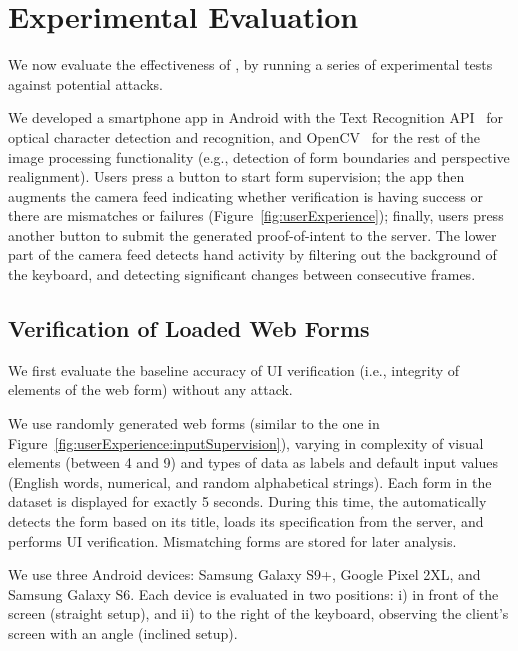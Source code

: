 \section{Experimental Evaluation} \label{sec:experimentalEvaluation}

We now evaluate the effectiveness of \sysname, by running a series of experimental tests against potential attacks.

We developed a smartphone app in Android with the Text Recognition API~\cite{googleOCR} for optical character detection and recognition, and OpenCV~\cite{openCV} for the rest of the image processing functionality (e.g., detection of form boundaries and perspective realignment).
Users press a button to start form supervision; the app then augments the camera feed indicating whether verification is having success or there are mismatches or failures (Figure~\ref{fig:userExperience}); finally, users press another button to submit the generated proof-of-intent to the server.
The lower part of the camera feed detects hand activity by filtering out the background of the keyboard, and detecting significant changes between consecutive frames.

\subsection{Verification of Loaded Web Forms} \label{ssec:UIVerificationEvaluation}

We first evaluate the baseline accuracy of UI verification (i.e., integrity of elements of the web form) without any attack.


We use \numforms randomly generated web forms (similar to the one in Figure~\ref{fig:userExperience:inputSupervision}), varying in complexity of visual elements (between 4 and 9) and types of data as labels and default input values (English words, numerical, and random alphabetical strings).
Each form in the dataset is displayed for exactly 5 seconds.
During this time, the \app automatically detects the form based on its title, loads its specification from the server, and performs UI verification.
Mismatching forms are stored for later analysis.

We use three Android devices: Samsung Galaxy S9+, Google Pixel 2XL, and Samsung Galaxy S6. Each device is evaluated in two positions: i) in front of the screen (straight setup), and ii) to the right of the keyboard, observing the client's screen with an angle (inclined setup).

